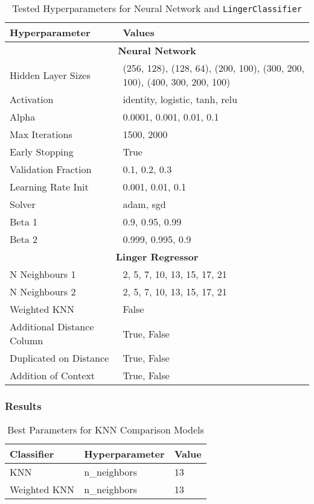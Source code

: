 \documentclass[a4paper, 12pt]{report}
\begin{document}
\begin{table}[H]
    \centering
    \caption{Tested Hyperparameters for Neural Network and \texttt{LingerClassifier}}
    \label{tab:hyperparameters_raisin}
    \begin{tabular}{|l|l|}
    \hline
    \textbf{Hyperparameter} & \textbf{Values} \\ \hline
    \multicolumn{2}{|c|}{\textbf{Neural Network}} \\ \hline
    Hidden Layer Sizes & (256, 128), (128, 64), (200, 100), (300, 200, 100), (400, 300, 200, 100) \\ \hline
    Activation & identity, logistic, tanh, relu \\ \hline
    Alpha & 0.0001, 0.001, 0.01, 0.1 \\ \hline
    Max Iterations & 1500, 2000 \\ \hline
    Early Stopping & True \\ \hline
    Validation Fraction & 0.1, 0.2, 0.3 \\ \hline
    Learning Rate Init & 0.001, 0.01, 0.1 \\ \hline
    Solver & adam, sgd \\ \hline
    Beta 1 & 0.9, 0.95, 0.99 \\ \hline
    Beta 2 & 0.999, 0.995, 0.9 \\ \hline
    \multicolumn{2}{|c|}{\textbf{Linger Regressor}} \\ \hline
    N Neighbours 1 & 2, 5, 7, 10, 13, 15, 17, 21 \\ \hline
    N Neighbours 2 & 2, 5, 7, 10, 13, 15, 17, 21 \\ \hline
    Weighted KNN & False \\ \hline
    Additional Distance Column & True, False \\ \hline
    Duplicated on Distance & True, False \\ \hline
    Addition of Context & True, False \\ \hline
    \end{tabular}
\end{table}
\clearpage

\subsubsection{Results}

\begin{table}[H]
    \centering
    \caption{Best Parameters for KNN Comparison Models}
    \label{tab:best_parameters_combined_knn_exp3}
    \begin{tabular}{|l|l|l|}
    \toprule
    \textbf{Classifier} & \textbf{Hyperparameter} & \textbf{Value} \\
    \midrule
    KNN & n\_neighbors & 13 \\
    Weighted KNN & n\_neighbors & 13 \\
    \bottomrule
\end{tabular}
\end{table}
\end{document}
